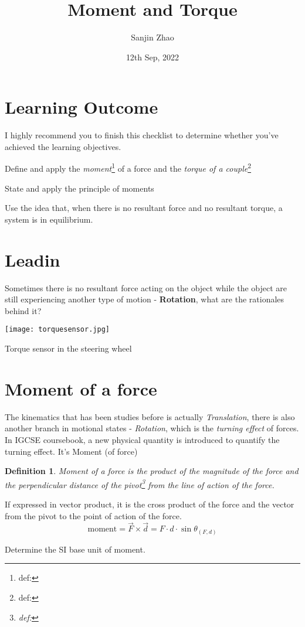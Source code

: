 \documentclass[a4paper]{tufte-handout}
\title{Moment and Torque}
\author{Sanjin Zhao}
\date{12th Sep, 2022}  %
\newtheorem{definition}[theorem]{Definition}%
\newenvironment{TaskBox} %
{\begin{tcolorbox}[breakable,colback=b1!30,colframe=b1,title=Task]} {\end{tcolorbox}}
\begin{document}
\maketitle%
\section*{Learning Outcome}
I highly recommend you to finish this checklist to determine whether you've achieved the learning objectives.
\begin{todolist}
  \item Define and apply the \emph{moment}\footnote{def:} of a force and the \emph{torque of a couple}\footnote{def:}
  \item State and apply the principle of moments
  \item Use the idea that, when there is no resultant force and no resultant torque, a system is in equilibrium.
\end{todolist}
\clearpage

\section{Leadin}
Sometimes there is no resultant force acting on the object while the object are still experiencing another type of motion - \textbf{Rotation}, what are the rationales behind it?
\begin{marginfigure}
\texttt{[image: torquesensor.jpg]}
\caption{Torque sensor in the steering wheel}
\end{marginfigure}

\section{Moment of a force}
The kinematics that has been studies before is actually \emph{Translation}, there is also another branch in motional states - \emph{Rotation}, which is the \emph{turning effect} of forces. In IGCSE coursebook, a new physical quantity is introduced to quantify the turning effect. It's Moment (of force)

\begin{definition}
Moment of a force is the product of the magnitude of the force and the perpendicular distance of the pivot\footnote{def:} from the line of action of the force.
\end{definition}
If expressed in vector product, it is the cross product of the force and the vector from the pivot to the point of action of the force.
\begin{equation}
  \text{moment} = \vec{F}\times \vec{d} = F\cdot d \cdot \sin\theta_{\left( {F,d}\right)}
\end{equation}
\begin{TaskBox}
Determine the SI base unit of moment.
\vspace{0.3in}  
\end{TaskBox}
\end{document}
